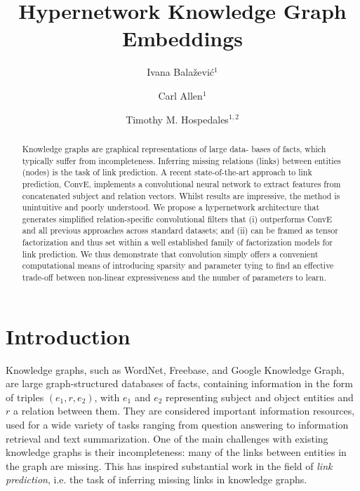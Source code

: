 \documentclass[runningheads]{llncs}
\begin{document}
%
\title{Hypernetwork Knowledge Graph Embeddings}
%
%
\author{Ivana Bala\v{z}evi\'c$^1$ \and
Carl Allen$^1$ \and
Timothy M. Hospedales$^{1,2}$}
%
%
%
\maketitle              %
%
\begin{abstract}
Knowledge graphs are graphical representations of large data- bases of facts, which typically suffer from incompleteness. Inferring missing relations (links) between entities (nodes) is the task of link prediction. A recent state-of-the-art approach to link prediction, ConvE, implements a convolutional neural network to extract features from concatenated subject and relation vectors. Whilst results are impressive, the method is unintuitive and poorly understood. We propose a hypernetwork architecture that generates simplified relation-specific convolutional filters that (i) outperforms ConvE and all previous approaches across standard datasets; and (ii) can be framed as tensor factorization and thus set within a well established family of factorization models for link prediction. We thus demonstrate that convolution simply offers a convenient computational means of introducing sparsity and parameter tying to find an effective trade-off between non-linear expressiveness and the number of parameters to learn.

\end{abstract}
%
%
%
\section{Introduction}

Knowledge graphs, such as WordNet, Freebase, and Google Knowledge Graph, are large graph-structured databases of facts, containing information in the form of triples $(e_1, r, e_2)$, with $e_1$ and $e_2$ representing subject and object entities and $r$ a relation between them. They are considered important information resources, used for a wide variety of tasks ranging from question answering to information retrieval and text summarization. One of the main challenges with existing knowledge graphs is their incompleteness: many of the links between entities in the graph are missing. This has inspired substantial work in the field of \emph{link prediction}, i.e. the task of inferring missing links in knowledge graphs.
\end{document}
